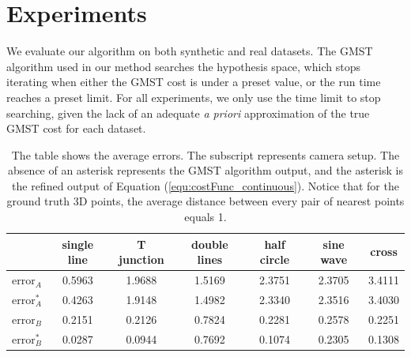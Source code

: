 
\section{Experiments}
We evaluate our algorithm on both synthetic and real datasets.
The GMST algorithm used in our method \cite{Ferreira_ESWA2012} searches the hypothesis space, which stops iterating when either the GMST cost is under a preset value, or the run time reaches a preset limit. For all experiments, we only use the time limit to stop searching, given the lack of an adequate {\em a priori} approximation of the true  GMST cost for each dataset.
\begin{table}
\centering
\begin{tabular}{|c|c|c|c|c|c|c|}  \hline
               & single line & T junction & double lines & half circle & sine wave & cross \\
  \hline
  $\text{error}_A$ & 0.5963 & 1.9688 & 1.5169 & 2.3751  & 2.3705 & 3.4111\\
  \hline
  $\text{error}^*_A$ & 0.4263 & 1.9148 & 1.4982 & 2.3340  & 2.3516 & 3.4030 \\
  \hline
  $\text{error}_B$ & 0.2151 & 0.2126 & 0.7824 & 0.2281& 0.2578 &0.2251 \\
  \hline
  $\text{error}^*_B$ & 0.0287 & 0.0944 & 0.7692 & 0.1074 & 0.2305 & 0.1308\\
  \hline
\end{tabular}
\caption[Quantitative evaluation of JOST on synthetic data]{ The table shows the average errors. The subscript represents camera setup. The absence of an asterisk represents the GMST algorithm output, and the asterisk is the refined output of Equation (\ref{equ:costFunc_continuous}). Notice that for the ground truth 3D points, the average distance between every pair of nearest points equals 1. }
\label{fig:syntheticDataResult}
\end{table}

